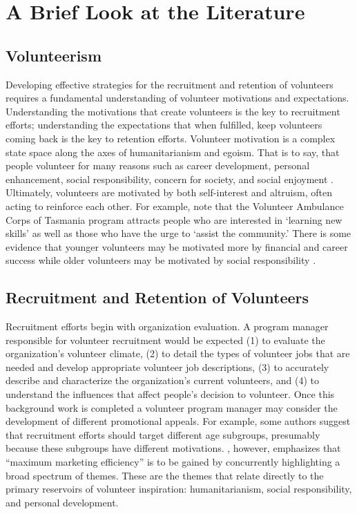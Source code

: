 \documentclass[11pt,fleqn]{book} %
\begin{document}
\chapter{A Brief Look at the Literature}

\section{Volunteerism}
Developing effective strategies for the recruitment and retention of volunteers requires a fundamental understanding of volunteer motivations and expectations. Understanding the motivations that create volunteers is the key to recruitment efforts; understanding the expectations that when fulfilled, keep volunteers coming back is the key to retention efforts. Volunteer motivation is a complex state space along the axes of humanitarianism and egoism. That is to say, that people volunteer for many reasons such as career development, personal enhancement, social responsibility, concern for society, and social enjoyment \autocite{shields_young_2009}. Ultimately, volunteers are motivated by both self-interest and altruism, often acting to reinforce each other. For example, \textcite{fahey_training_2002} note that the Volunteer Ambulance Corps of Tasmania program attracts people who are interested in \enquote*{learning new skills} as well as those who have the urge to \enquote*{assist the community.} There is some evidence that younger volunteers may be motivated more by financial and career success while older volunteers may be motivated by social responsibility \autocite{shields_young_2009}.



\section{Recruitment and Retention of Volunteers}

Recruitment efforts begin with organization evaluation. A program manager responsible for volunteer recruitment would be expected (1) to evaluate the organization's volunteer climate, (2) to detail the types of volunteer jobs that are needed and develop appropriate volunteer job descriptions, (3) to accurately  describe and characterize the organization's current volunteers, and (4) to understand the influences that affect people's decision to volunteer. Once this background work is completed a volunteer program manager may consider the development of different promotional appeals. For example, some authors suggest that recruitment efforts should target different age subgroups, presumably because these subgroups have different motivations. \textcite{shields_young_2009}, however, emphasizes that \enquote{maximum marketing efficiency} is to be gained by concurrently highlighting a broad spectrum of themes. These are the themes that relate directly to the primary reservoirs of volunteer inspiration: humanitarianism, social responsibility, and personal development.\\
\end{document}
